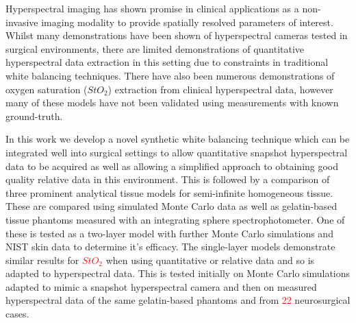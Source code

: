 Hyperspectral imaging has shown promise in clinical applications as a non-invasive imaging modality to provide spatially resolved parameters of interest. Whilst many demonstrations have been shown of hyperspectral cameras tested in surgical environments, there are limited demonstrations of quantitative hyperspectral data extraction in this setting due to constraints in traditional white balancing techniques. There have also been numerous demonstrations of oxygen saturation ($StO_2$) extraction from clinical hyperspectral data, however many of these models have not been validated using measurements with known ground-truth.

In this work we develop a novel synthetic white balancing technique which can be integrated well into surgical settings to allow quantitative snapshot hyperspectral data to be acquired as well as allowing a simplified approach to obtaining good quality relative data in this environment. This is followed by a comparison of three prominent analytical tissue models for semi-infinite homogeneous tissue. These are compared using simulated Monte Carlo data as well as gelatin-based tissue phantoms measured with an integrating sphere spectrophotometer. One of these is tested as a two-layer model with further Monte Carlo simulations and NIST skin data to determine it’s efficacy. The single-layer models demonstrate similar results for  \textcolor{red}{$StO_2$} when using quantitative or relative data and so is adapted to hyperspectral data. This is tested initially on Monte Carlo simulations adapted to mimic a snapshot hyperspectral camera and then on measured hyperspectral data of the same gelatin-based phantoms and from  \textcolor{red}{22} neurosurgical cases.